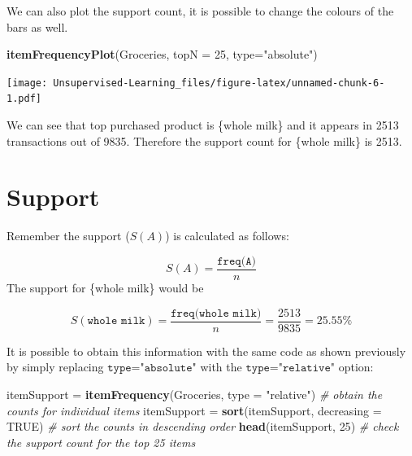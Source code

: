 \documentclass[
]{book}
\newenvironment{Shaded}{\begin{snugshade}}{\end{snugshade}}
\newcommand{\CommentTok}[1]{\textcolor[rgb]{0.56,0.35,0.01}{\textit{#1}}}
\newcommand{\DataTypeTok}[1]{\textcolor[rgb]{0.13,0.29,0.53}{#1}}
\newcommand{\DecValTok}[1]{\textcolor[rgb]{0.00,0.00,0.81}{#1}}
\newcommand{\KeywordTok}[1]{\textcolor[rgb]{0.13,0.29,0.53}{\textbf{#1}}}
\newcommand{\NormalTok}[1]{#1}
\newcommand{\OtherTok}[1]{\textcolor[rgb]{0.56,0.35,0.01}{#1}}
\newcommand{\StringTok}[1]{\textcolor[rgb]{0.31,0.60,0.02}{#1}}
\begin{document}
We can also plot the support count, it is possible to change the colours of the bars as well.

\begin{Shaded}
\begin{Highlighting}[]
\KeywordTok{itemFrequencyPlot}\NormalTok{(Groceries, }\DataTypeTok{topN =} \DecValTok{25}\NormalTok{, }\DataTypeTok{type=}\StringTok{"absolute"}\NormalTok{)}
\end{Highlighting}
\end{Shaded}

\texttt{[image: Unsupervised-Learning\_files/figure-latex/unnamed-chunk-6-1.pdf]}

We can see that top purchased product is \{whole milk\} and it appears in 2513 transactions out of 9835. Therefore the support count for \{whole milk\} is 2513.

\hypertarget{support}{%
\section{Support}\label{support}}

Remember the support (\(S(A)\)) is calculated as follows:

\[S(A)=\frac{\texttt{freq({A})}}{n}\]
The support for \{whole milk\} would be

\[S(\texttt{{whole milk}})=\frac{\texttt{freq({whole milk})}}{n}=\frac{2513}{9835}=25.55\%\]

It is possible to obtain this information with the same code as shown previously by simply replacing \(\texttt{type="absolute"}\) with the \(\texttt{type="relative"}\) option:

\begin{Shaded}
\begin{Highlighting}[]
\NormalTok{itemSupport =}\StringTok{ }\KeywordTok{itemFrequency}\NormalTok{(Groceries, }\DataTypeTok{type =} \StringTok{"relative"}\NormalTok{) }\CommentTok{# obtain the counts for individual items}
\NormalTok{itemSupport =}\StringTok{ }\KeywordTok{sort}\NormalTok{(itemSupport, }\DataTypeTok{decreasing =} \OtherTok{TRUE}\NormalTok{) }\CommentTok{# sort the counts in descending order}
\KeywordTok{head}\NormalTok{(itemSupport, }\DecValTok{25}\NormalTok{) }\CommentTok{# check the support count for the top 25 items}
\end{Highlighting}
\end{Shaded}
\end{document}

